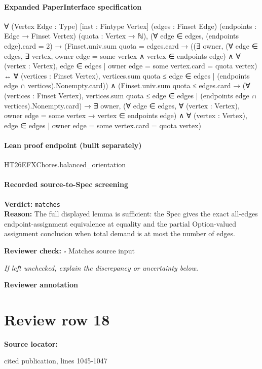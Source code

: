 \documentclass[10pt]{article}
\newcommand{\reviewerbox}{%
  \par\noindent\fbox{\parbox{0.96\linewidth}{\rule{0pt}{0.38in}}}\par
}
\newcommand{\reviewmatch}[1]{%
  \par\noindent\textbf{Reviewer check:} $\square$\; #1\par
  \noindent\emph{If left unchecked, explain the discrepancy or uncertainty below.}\par
}
\begin{document}
\paragraph{Expanded PaperInterface specification}
\begin{ReviewVerbatim}
∀ (Vertex Edge : Type) [inst : Fintype Vertex] (edges : Finset Edge) (endpoints : Edge → Finset Vertex)
  (quota : Vertex → ℕ),
  (∀ edge ∈ edges, (endpoints edge).card = 2) →
    (Finset.univ.sum quota = edges.card →
        ((∃ owner,
            (∀ edge ∈ edges, ∃ vertex, owner edge = some vertex ∧ vertex ∈ endpoints edge) ∧
              ∀ (vertex : Vertex), {edge ∈ edges | owner edge = some vertex}.card = quota vertex) ↔
          ∀ (vertices : Finset Vertex),
            vertices.sum quota ≤ {edge ∈ edges | (endpoints edge ∩ vertices).Nonempty}.card)) ∧
      (Finset.univ.sum quota ≤ edges.card →
        (∀ (vertices : Finset Vertex),
            vertices.sum quota ≤ {edge ∈ edges | (endpoints edge ∩ vertices).Nonempty}.card) →
          ∃ owner,
            (∀ edge ∈ edges, ∀ (vertex : Vertex), owner edge = some vertex → vertex ∈ endpoints edge) ∧
              ∀ (vertex : Vertex), {edge ∈ edges | owner edge = some vertex}.card = quota vertex)
\end{ReviewVerbatim}

\paragraph{Lean proof endpoint (built separately)}\begin{ReviewVerbatim}
HT26EFXChores.balanced_orientation
\end{ReviewVerbatim}

\paragraph{Recorded source-to-Spec screening}
\textbf{Verdict:} \texttt{matches}
\\
\textbf{Reason:} The full displayed lemma is sufficient: the Spec gives the exact all-edges endpoint-assignment equivalence at equality and the partial Option-valued assignment conclusion when total demand is at most the number of edges.
\reviewmatch{Matches source input}
\noindent\textbf{Reviewer annotation}\par
\reviewerbox
\clearpage
\hypertarget{source-claim-6263bf063357fb29}{}
\section*{Review row 18}
\textbf{Source locator:} {\footnotesize\raggedright cited publication, lines 1045-\allowbreak{}1047\par}
\end{document}
